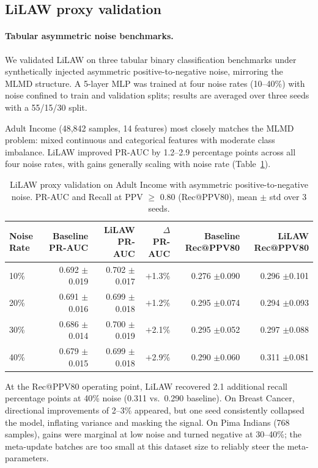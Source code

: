 \subsection{LiLAW proxy validation}

\paragraph{Tabular asymmetric noise benchmarks.}

We validated LiLAW on three tabular binary classification benchmarks under synthetically injected asymmetric positive-to-negative noise, mirroring the MLMD structure. A 5-layer MLP was trained at four noise rates (10--40\%) with noise confined to train and validation splits; results are averaged over three seeds with a 55/15/30 split.

Adult Income (48,842 samples, 14 features) most closely matches the MLMD problem: mixed continuous and categorical features with moderate class imbalance. LiLAW improved PR-AUC by 1.2--2.9 percentage points across all four noise rates, with gains generally scaling with noise rate (Table~\ref{tab:poc_adult}).

\begin{table}[htbp]
    \centering
    \caption{LiLAW proxy validation on Adult Income with asymmetric positive-to-negative noise. PR-AUC and Recall at PPV $\geq$ 0.80 (Rec@PPV80), mean $\pm$ std over 3 seeds.}
    \label{tab:poc_adult}
    \small
    \begin{tabular}{lrrrrr}
        \toprule
        \textbf{Noise Rate} & \textbf{Baseline PR-AUC} & \textbf{LiLAW PR-AUC} & \textbf{$\Delta$ PR-AUC} & \textbf{Baseline Rec@PPV80} & \textbf{LiLAW Rec@PPV80} \\
        \midrule
        10\% & 0.692 $\pm$0.019 & 0.702 $\pm$0.017 & $+$1.3\% & 0.276 $\pm$0.090 & 0.296 $\pm$0.101 \\
        20\% & 0.691 $\pm$0.016 & 0.699 $\pm$0.018 & $+$1.2\% & 0.295 $\pm$0.074 & 0.294 $\pm$0.093 \\
        30\% & 0.686 $\pm$0.014 & 0.700 $\pm$0.019 & $+$2.1\% & 0.295 $\pm$0.052 & 0.297 $\pm$0.088 \\
        40\% & 0.679 $\pm$0.015 & 0.699 $\pm$0.018 & $+$2.9\% & 0.290 $\pm$0.060 & 0.311 $\pm$0.081 \\
        \bottomrule
    \end{tabular}
\end{table}

At the Rec@PPV80 operating point, LiLAW recovered 2.1 additional recall percentage points at 40\% noise (0.311 vs.\ 0.290 baseline). On Breast Cancer, directional improvements of 2--3\% appeared, but one seed consistently collapsed the model, inflating variance and masking the signal. On Pima Indians (768 samples), gains were marginal at low noise and turned negative at 30--40\%; the meta-update batches are too small at this dataset size to reliably steer the meta-parameters.

